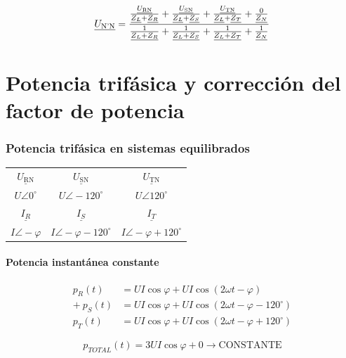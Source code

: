 \documentclass{article}
\begin{document}
\begin{equation}
    \Large
    \underline{U_{\text{N'N}}} = \frac{    \frac{\underline{U_{\text{RN}}}}{\underline{Z_{L}} + \underline{Z_{R}}} +
    \frac{\underline{U_{\text{SN}}}}{\underline{Z_{L}} + \underline{Z_{S}}} +
    \frac{\underline{U_{\text{TN}}}}{\underline{Z_{L}} + \underline{Z_{T}}} +
    \frac{0}{\underline{Z_{N}}} }{\frac{1}{\underline{Z_{L} + Z_{R}}} + \frac{1}{\underline{Z_{L} + Z_{S}}} + \frac{1}{\underline{Z_{L} + Z_{T}}} + \frac{1}{\underline{Z_{N}}}}
\end{equation}


\part{Potencia trifásica y corrección del factor de potencia}
\section{Potencia trifásica en sistemas equilibrados}
\begin{table}[h!]
\centering
\begin{tabular}{c c c}
    $\underline{U_{\text{RN}}}$ & $\underline{U_{\text{SN}}}$ & $\underline{U_{\text{TN}}}$ \\
    $U \angle 0^\circ$ & $U \angle -120^\circ$ & $U \angle 120^\circ$ \\
    $\underline{I_{R}}$ & $\underline{I_{S}}$ & $\underline{I_{T}}$ \\
    $I \angle - \varphi$ & $I \angle - \varphi - 120^\circ$ & $I \angle - \varphi + 120^\circ$ \\
\end{tabular}
\label{tabla:pot}
\end{table}

\subsection{Potencia instantánea constante}
\begin{align*}
	p_{R} (t) & = UI \cos \varphi + UI \cos (2 \omega t - \varphi) \\
	+ \ p_{S} (t) & = UI \cos \varphi + UI \cos (2 \omega t - \varphi - 120^\circ) \\
	p_{T} (t) & = UI \cos \varphi + UI \cos (2 \omega t - \varphi + 120^\circ) 
\end{align*}
\hline

$$
p_{TOTAL} (t) = 3 UI \cos \varphi + 0 \to \text{CONSTANTE}
$$
\end{document}

